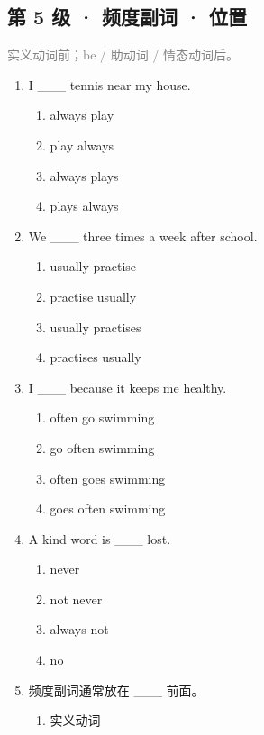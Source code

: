 \documentclass[11pt,a4paper]{ctexart}
\begin{document}
\subsection*{第 5 级 · 频度副词 · 位置}
\noindent\textcolor{gray}{实义动词前；be / 助动词 / 情态动词后。}\par\smallskip
\begin{enumerate}[leftmargin=*,itemsep=4pt]
\item I \_\_\_ tennis near my house.
\begin{enumerate}[label=\Alph*.,leftmargin=2em,itemsep=1pt,topsep=2pt]
\item always play
\item play always
\item always plays
\item plays always
\end{enumerate}
\item We \_\_\_ three times a week after school.
\begin{enumerate}[label=\Alph*.,leftmargin=2em,itemsep=1pt,topsep=2pt]
\item usually practise
\item practise usually
\item usually practises
\item practises usually
\end{enumerate}
\item I \_\_\_ because it keeps me healthy.
\begin{enumerate}[label=\Alph*.,leftmargin=2em,itemsep=1pt,topsep=2pt]
\item often go swimming
\item go often swimming
\item often goes swimming
\item goes often swimming
\end{enumerate}
\item A kind word is \_\_\_ lost.
\begin{enumerate}[label=\Alph*.,leftmargin=2em,itemsep=1pt,topsep=2pt]
\item never
\item not never
\item always not
\item no
\end{enumerate}
\item 频度副词通常放在 \_\_\_ 前面。
\begin{enumerate}[label=\Alph*.,leftmargin=2em,itemsep=1pt,topsep=2pt]
\item 实义动词

\end{enumerate}
\end{enumerate}
\end{document}
